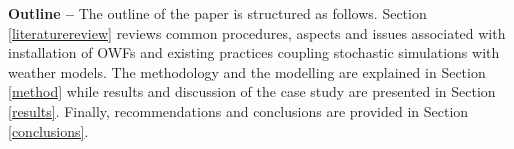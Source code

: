 \textbf{Outline --}
The outline of the paper is structured as follows. Section \ref{literaturereview} reviews common procedures, aspects and issues associated with installation of OWFs and existing practices coupling stochastic simulations with weather models. The methodology and the modelling are explained in Section \ref{method} while results and discussion of the case study are presented in Section \ref{results}. Finally, recommendations and conclusions are provided in Section \ref{conclusions}.